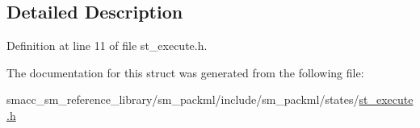 \subsection{Detailed Description}


Definition at line 11 of file st\+\_\+execute.\+h.



The documentation for this struct was generated from the following file\+:\begin{DoxyCompactItemize}
\item 
smacc\+\_\+sm\+\_\+reference\+\_\+library/sm\+\_\+packml/include/sm\+\_\+packml/states/\hyperlink{st__execute_8h}{st\+\_\+execute.\+h}\end{DoxyCompactItemize}
